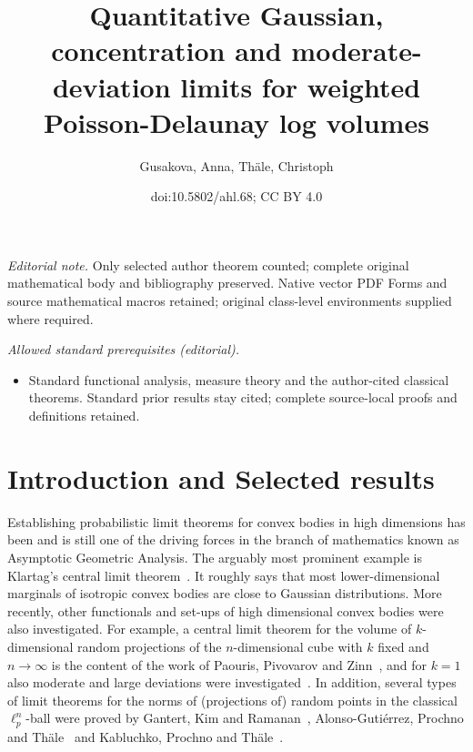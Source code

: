 \documentclass[10pt]{amsart}
\title{Quantitative Gaussian, concentration and moderate-deviation limits for weighted Poisson-Delaunay log volumes}
\author{Gusakova, Anna, Thäle, Christoph}
\date{doi:10.5802/ahl.68; CC BY 4.0}
\theoremstyle{definition}\newtheorem{defi}[theo]{Definition}\newtheorem{rema}[theo]{Remark}\newtheorem{exam}[theo]{Example}\newtheorem{exem}[theo]{Example}\newtheorem{nota}[theo]{Notation}
\begin{document}
\maketitle
\noindent\textit{Editorial note.} Only selected author theorem counted; complete original mathematical body and bibliography preserved. Native vector PDF Forms and source mathematical macros retained; original class-level environments supplied where required.\par\medskip
\noindent\textit{Allowed standard prerequisites (editorial).}\begin{itemize}
\item Standard functional analysis, measure theory and the author-cited classical theorems. Standard prior results stay cited; complete source-local proofs and definitions retained.
\end{itemize}\medskip

\section{Introduction and Selected results}

Establishing probabilistic limit theorems for convex bodies in high dimensions has been and is still one of the driving forces in the branch of mathematics known as Asymptotic Geometric Analysis. The arguably most prominent example is Klartag's central limit theorem~\cite{KlartagCLT}. It roughly says that most lower-dimensional marginals of isotropic convex bodies are close to Gaussian distributions. More recently, other functionals and set-ups of high dimensional convex bodies were also investigated. For example, a central limit theorem for the volume of $k$-dimensional random projections of the $n$-dimensional cube with $k$ fixed and $n\to\infty$ is the content of the work of Paouris, Pivovarov and Zinn~\cite{PPZ}, and for $k=1$ also moderate and large deviations were investigated~\cite{KPT19a,KPT19b}. In addition, several types of limit theorems for the norms of (projections of) random points in the classical $\ell_p^n$-ball were proved by Gantert, Kim and Ramanan~\cite{GKR}, Alonso-Gutiérrez, Prochno and Th\"ale~\cite{APT18,APT17} and Kabluchko, Prochno and Th\"ale~\cite{KPT19a,KPT19b}.
\end{document}
